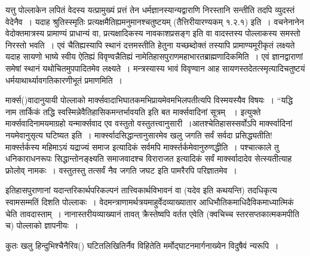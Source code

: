 यत्तु पोल्लाकेन लपितं वेदस्य यत्प्रामुख्यं प्रत्तं तेन धर्मज्ञानस्यान्यद्वाराणि निरस्तानि सन्तीति तदपि व्युदस्तं वेदेनैव~। यदाह श्रुतिस्स्मृतिः
 प्रत्यक्षमैतिह्यमनुमानश्चतुष्टयम् (तैत्तिरीयारण्यकम् १.२.१) इति~। वचनेनानेन वेदोक्तमात्रस्य प्रामाण्यं प्राधान्यं वा, प्रत्यक्षादिकस्य नावकाशप्रसङ्ग इति वा वादस्तस्य पोल्लाकस्य समस्तो निरस्तो भवति~। एवं चैतिह्यस्यापि स्थानं दत्तमस्तीति हेतुना यच्छब्दोक्तं तस्यापि प्रामाण्यमूरीकृतं लक्ष्यते यदाह सायणो भाष्ये स्वीय ऐतिह्यं विवृण्वन्नैतिह्यं नामेतिहासपुराणमहाभारतब्राह्मणादिकमिति~। एवं ज्ञानद्वाराणां समेषां स्थानं यथोचितमुपपादितमेव लक्ष्यते~। मन्त्रस्यास्य भावं विवृण्वान आह सायणस्तदेतत्स्मृत्यादिचतुष्टयं धर्मयाथार्थ्यावगतिकारणीभूतं प्रमाणमिति~।

मार्क्स()वादानुयायी पोल्लाको मार्क्सवादाभिघातकमभिप्रायमेवमभिलपतीत्यपि विस्मयस्यैव विषयः~। “यद्धि नाम तार्किकं तद्धि स्वस्मिन्नेवैतिहासिकमन्तर्भावयति  इति बत मार्क्सवादिनां सूत्रम् ~। इत्युक्ते मार्क्सवादिनामयमाग्रहो यन्मार्क्सवाद एव वस्तुतो वस्तुतत्त्वानुसारी~।\break आतश्चेतिहासस्सर्वोऽपि मार्क्स्वादिनां नयमेवानुसृत्य घटिष्यत इति~। मार्क्स्वादसिद्धान्तानुसारमेव खलु जगति सर्वं सर्वदा प्रसिद्ध्यतीति! मार्क्स्तर्कस्य महिमाऽयं यद्राज्यं समाज इत्यादिकं सर्वमपि मार्क्स्तर्कमेवानुरुणद्धीति~। पश्चात्काले तु धनिकाराधनरूपः  सिद्धान्तो\break नङ्क्ष्यति समाजवादश्च विराराजत इत्यादिकं सर्वं मार्क्स्वादादेव सेत्स्यतीत्याह फ्रोलोव् \break नामकः~। वस्तुतस्तु तत्सर्वं नैव जगति जघट इति पामरैरपि परिज्ञातमेव~।

इतिहासपुराणानां यदान्तरिकार्थपरिकल्पनं तात्त्विकार्थविभावनं वा (यदेव  इति कथयन्ति) तदधिकृत्य स्वामसम्मतिं दिशति पोल्लाकः~। वेदमन्त्राणामर्थत्रयमाहुर्वेदव्याख्यातार आधिभौतिकमाधिदैविकमाध्यात्मिकं चेति तावदास्ताम्~। नानास्तरीयव्याख्यानं तावत् क्रैस्तेष्वपि वर्तत एवेति (क्वचिच्च स्तरसप्तकात्मकमपीति च) पोल्लाको ज्ञापनीयः~।

कुतः खलु हिन्दुभिश्चैनैरिव() घटितलिखितिर्नैव विहितेति मर्मोद्घाटनमार्गनाख्येन विदुषैवं न्यरूपि~।

\begin{myquote}

~\hfill {}
\end{myquote}

